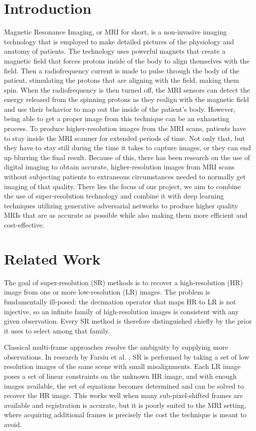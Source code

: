 \documentclass[conference]{IEEEtran}
\begin{document}
\section{Introduction}
Magnetic Resonance Imaging, or MRI for short, is a non-invasive imaging technology that is employed to make detailed pictures of the physiology and anatomy of patients. The technology uses powerful magnets that create a magnetic field that forces protons inside of the body to align themselves with the field. Then a radiofrequency current is made to pulse through the body of the patient, stimulating the protons that are aligning with the field, making them spin. When the radiofrequency is then turned off, the MRI sensors can detect the energy released from the spinning protons as they realign with the magnetic field and use their behavior to map out the inside of the patient's body. However, being able to get a proper image from this technique can be an exhausting process. \cite{wadhwa2019review, despotovic2015mri, suetens2017fundamentals} To produce higher-resolution images from the MRI scans, patients have to stay inside the MRI scanner for extended periods of time. Not only that, but they have to stay still during the time it takes to capture images, or they can end up blurring the final result. Because of this, there has been research on the use of digital imaging to obtain accurate, higher-resolution images from MRI scans without subjecting patients to extraneous circumstances needed to normally get imaging of that quality. There lies the focus of our project, we aim to combine the use of super-resolution technology and combine it with deep learning techniques utilizing generative adversarial networks to produce higher quality MRIs that are as accurate as possible while also making them more efficient and cost-effective.

\section{Related Work}
The goal of super-resolution (SR) methods is to recover a high-resolution (HR) image from one or more low-resolution (LR) images. The problem is fundamentally ill-posed: the decimation operator that maps HR to LR is not injective, so an infinite family of high-resolution images is consistent with any given observation. Every SR method is therefore distinguished chiefly by the prior it uses to select among that family.

Classical multi-frame approaches resolve the ambiguity by supplying more observations. In research by Farsiu et al. \cite{farsiu2004fast}, SR is performed by taking a set of low resolution images of the same scene with small misalignments. Each LR image poses a set of linear constraints on the unknown HR image, and with enough images available, the set of equations becomes determined and can be solved to recover the HR image. This works well when many sub-pixel-shifted frames are available and registration is accurate, but it is poorly suited to the MRI setting, where acquiring additional frames is precisely the cost the technique is meant to avoid.
\end{document}
